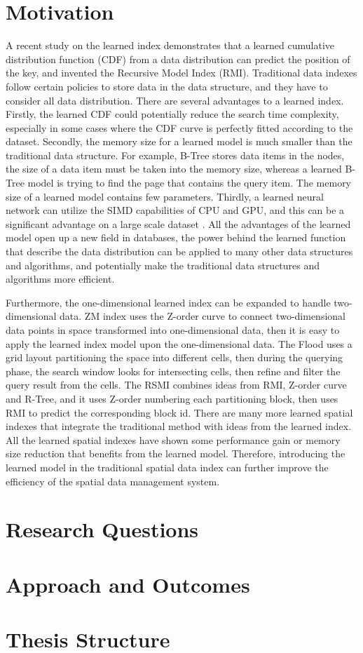 \section{Motivation}
A recent study on the learned index \cite{Kraska:2017vh} demonstrates that a learned cumulative distribution function (CDF) from a data distribution can predict the position of the key, and invented the Recursive Model Index (RMI). Traditional data indexes follow certain policies to store data in the data structure, and they have to consider all data distribution. There are several advantages to a learned index. Firstly, the learned CDF could potentially reduce the search time complexity, especially in some cases where the CDF curve is perfectly fitted according to the dataset. Secondly, the memory size for a learned model is much smaller than the traditional data structure. For example, B-Tree stores data items in the nodes, the size of a data item must be taken into the memory size, whereas a learned B-Tree model is trying to find the page that contains the query item. The memory size of a learned model contains few parameters. Thirdly, a learned neural network can utilize the SIMD capabilities of CPU and GPU, and this can be a significant advantage on a large scale dataset \cite{patterson2016computer}. All the advantages of the learned model open up a new field in databases, the power behind the learned function that describe the data distribution can be applied to many other data structures and algorithms, and potentially make the traditional data structures and algorithms more efficient. 

Furthermore, the one-dimensional learned index can be expanded to handle two-dimensional data. ZM index \cite{Wang:2019ks} uses the Z-order curve to connect two-dimensional data points in space transformed into one-dimensional data, then it is easy to apply the learned index model upon the one-dimensional data. The Flood \cite{Nathan:2019wc} uses a grid layout partitioning the space into different cells, then during the querying phase, the search window looks for intersecting cells, then refine and filter the query result from the cells. The RSMI \cite{Qi:2020uz} combines ideas from RMI, Z-order curve and R-Tree, and it uses Z-order numbering each partitioning block, then uses RMI to predict the corresponding block id. There are many more learned spatial indexes that integrate the traditional method with ideas from the learned index. All the learned spatial indexes have shown some performance gain or memory size reduction that benefits from the learned model. Therefore, introducing the learned model in the traditional spatial data index can further improve the efficiency of the spatial data management system. 



\section{Research Questions}


\section{Approach and Outcomes}


\section{Thesis Structure}
